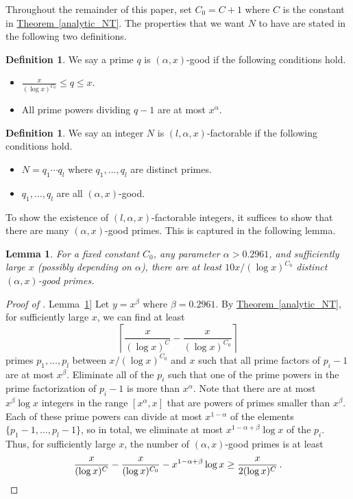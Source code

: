 \documentclass[11pt]{article}
\numberwithin{equation}{section}
\newtheorem{lemma}[theorem]{Lemma}
\theoremstyle{definition}
\theoremstyle{plain}
\newcommand{\expref}[2]{\hyperref[#2]{#1~\ref{#2}}}
\theoremstyle{definition}
\newtheorem{define}[theorem]{Definition}
\begin{document}
Throughout the remainder of this paper, set $C_0 = C+1$ where $C$ is the constant in \expref{Theorem}{analytic_NT}.  The properties that we want $N$ to have are stated in the following two definitions.
\begin{define}
We say a prime $q$ is $(\alpha,x)$-good if the following
%
conditions hold.    %
\begin{itemize}
    \item $\frac{x}{(\log x)^{C_0}} \leq q \leq x $.
    \item All prime powers dividing $q-1$ are at most $x^{\alpha} $.
\end{itemize}
\end{define}

\begin{define}
We say an integer $N$ is $(l, \alpha, x)$-factorable if the following
%
conditions hold.    %
\begin{itemize}
    \item $N = q_1 \cdots q_l$ where $q_1, \dots , q_l$ are distinct primes.
    \item $q_1, \dots , q_l$ are all $(\alpha,x)$-good.
\end{itemize}
\end{define}

To show the existence of $(l, \alpha, x)$-factorable integers, it suffices to show that there are many $(\alpha,x)$-good primes.  This is captured in the following lemma.
\begin{lemma}\label{construction}
For a fixed constant $C_0$, any parameter $\alpha > 0.2961$, and sufficiently large $x$ (possibly depending on $\alpha$), there are at least $10x/(\log x)^{C_0}$ distinct $(\alpha,x)$-good primes.
\end{lemma}








\begin{proof}[Proof of \expref{Lemma}{construction}]  Let $y = x^{\beta}$ where $\beta =  0.2961$.  By \expref{Theorem}{analytic_NT}, for sufficiently large $x$, we can find at least
%
\[ \left\lceil \frac{x}{(\log x)^C} - \frac{x}{(\log x)^{C_0 }} \right\rceil \] primes $p_1, \dots , p_l$ between $x/(\log x)^{C_0 }$ and $x$ such that all prime factors of $p_i - 1$ are at most $x^{\beta}$.  Eliminate all of the $p_i$ such that one of the prime powers in the prime factorization of $p_i - 1$ is more than $x^{\alpha}$.  Note that there are at most $x^{\beta} \log x$ integers in the range $[x^{\alpha}, x]$  that are powers of primes smaller than $x^{\beta}$.  Each of these prime powers can divide at most $x^{1 - \alpha}$ of the elements $\{ p_1 -1 , \dots , p_l-1\}$, so in total, we eliminate at most $x^{1 - \alpha + \beta} \log x$ of the $p_i$.  Thus, for sufficiently large $x$, the number of $(\alpha ,x)$-good primes is at least
\[
\frac{x}{(\log x)^C} - \frac{x}{(\log x)^{C_0 }} - x^{1 - \alpha + \beta} \log x \geq \frac{x}{2(\log x)^C} \,. \qedhere
\]
\end{proof}
\end{document}

